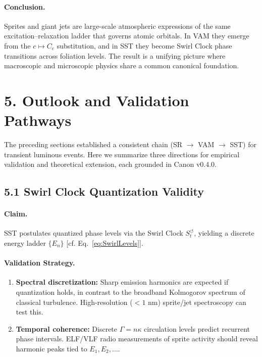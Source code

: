 \documentclass[11pt]{article}
\newcommand{\Ce}{C_{e}}
\begin{document}
    \paragraph{Conclusion.}
        Sprites and giant jets are large-scale atmospheric expressions
        of the same excitation--relaxation ladder that governs atomic
        orbitals. In VAM they emerge from the $c\mapsto \Ce$ substitution,
        and in SST they become Swirl Clock phase transitions across
        foliation levels. The result is a unifying picture where
        macroscopic and microscopic physics share a common canonical
        foundation.


\section*{5. Outlook and Validation Pathways}

The preceding sections established a consistent chain
(SR $\to$ VAM $\to$ SST) for transient luminous events.
Here we summarize three directions for empirical validation
and theoretical extension, each grounded in Canon v0.4.0.

\subsection*{5.1 Swirl Clock Quantization Validity}

    \paragraph{Claim.}
        SST postulates quantized phase levels via the Swirl Clock
        $S_t^{\boldsymbol{\circlearrowleft}}$, yielding a discrete energy ladder
        $\{E_n\}$ [cf. Eq.~\eqref{eq:SwirlLevels}].

    \paragraph{Validation Strategy.}
        \begin{enumerate}
        \item \textbf{Spectral discretization:}
        Sharp emission harmonics are expected if quantization holds, in contrast
        to the broadband Kolmogorov spectrum of classical turbulence.
        High-resolution ($<1$ nm) sprite/jet spectroscopy can test this.

        \item \textbf{Temporal coherence:}
        Discrete $\Gamma = n\kappa$ circulation levels predict recurrent
        phase intervals. ELF/VLF radio measurements of sprite activity
        should reveal harmonic peaks tied to $E_1, E_2, \dots$.
        \end{enumerate}
\end{document}
